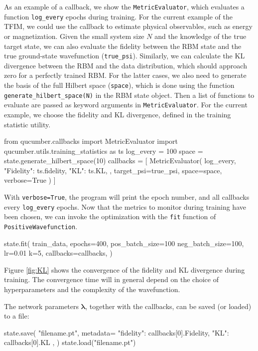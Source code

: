 \documentclass[submission, Phys, hidelinks]{SciPost}
\begin{document}
As an example of a callback, we show the \verb|MetricEvaluator|, which evaluates a function \verb|log_every| epochs during training. For the current example of the TFIM, we could use the callback to estimate physical observables, such as energy or magnetization. Given the small system size $N$ and the knowledge of the true target state, we can also evaluate the fidelity between the RBM state and the true ground-state wavefunction (\verb|true_psi|). Similarly, we can calculate the KL divergence between the RBM and the data distribution, which should approach zero for a perfectly trained RBM. For the latter cases, we also need to generate the basis of the full Hilbert space (\verb|space|), which is done using the function \verb|generate_hilbert_space(N)| in the RBM state object. Then a list of functions to evaluate are passed as keyword arguments in \verb|MetricEvaluator|. For the current example, we choose the fidelity and KL divergence, defined in the training statistic utility.
\begin{python}
from qucumber.callbacks import MetricEvaluator
import qucumber.utils.training_statistics as ts
log_every = 100
space = state.generate_hilbert_space(10)
callbacks = [
	MetricEvaluator(
		log_every,
		{
		"Fidelity": ts.fidelity, 
		"KL": ts.KL, 
		},
	target_psi=true_psi,
	space=space,
	verbose=True
	)
]
\end{python}
With \verb|verbose=True|, the program will print the epoch number, and all callbacks every \verb|log_every| epochs. Now that the metrics to monitor during training have been chosen, we can invoke the optimization with the \verb|fit| function of \verb|PositiveWavefunction|.
\begin{python}
state.fit(
	train_data,
	epochs=400,
	pos_batch_size=100
	neg_batch_size=100,
	lr=0.01
	k=5,
	callbacks=callbacks,
)
\end{python}

Figure \ref{fig:KL} shows the convergence of the fidelity and KL divergence during training. The convergence time will in general depend on the choice of hyperparameters and the complexity of the wavefunction.

The network parameters $\bm{\lambda}$, together with the callbacks, can be saved (or loaded) to a file:
\begin{python}
state.save(
	"filename.pt",
	metadata={
		"fidelity": callbacks[0].Fidelity,
		"KL": callbacks[0].KL
	},
)
state.load("filename.pt")
\end{python}
\end{document}
